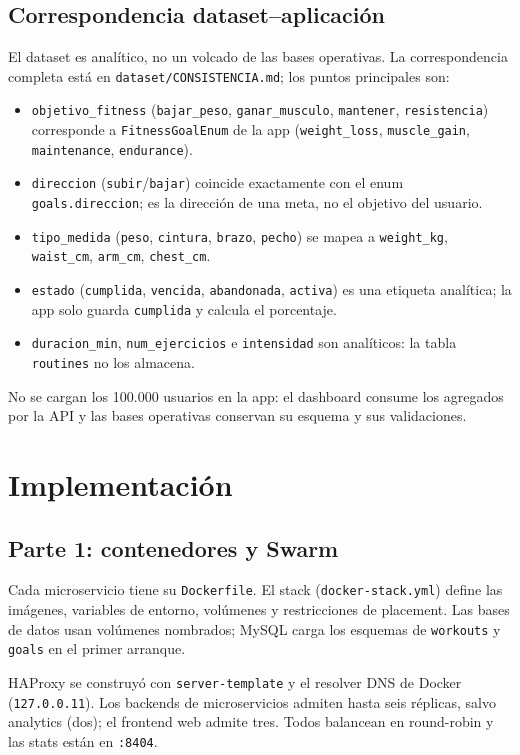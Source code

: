 \documentclass[conference]{IEEEtran}
\begin{document}
\subsection{Correspondencia dataset--aplicación}
El dataset es analítico, no un volcado de las bases operativas. La correspondencia completa está en
\texttt{dataset/CONSISTENCIA.md}; los puntos principales son:
\begin{itemize}
\item \texttt{objetivo\_fitness} (\texttt{bajar\_peso}, \texttt{ganar\_musculo}, \texttt{mantener},
\texttt{resistencia}) corresponde a \texttt{FitnessGoalEnum} de la app
(\texttt{weight\_loss}, \texttt{muscle\_gain}, \texttt{maintenance}, \texttt{endurance}).
\item \texttt{direccion} (\texttt{subir}/\texttt{bajar}) coincide exactamente con el enum
\texttt{goals.direccion}; es la dirección de una meta, no el objetivo del usuario.
\item \texttt{tipo\_medida} (\texttt{peso}, \texttt{cintura}, \texttt{brazo}, \texttt{pecho}) se
mapea a \texttt{weight\_kg}, \texttt{waist\_cm}, \texttt{arm\_cm}, \texttt{chest\_cm}.
\item \texttt{estado} (\texttt{cumplida}, \texttt{vencida}, \texttt{abandonada}, \texttt{activa}) es
una etiqueta analítica; la app solo guarda \texttt{cumplida} y calcula el porcentaje.
\item \texttt{duracion\_min}, \texttt{num\_ejercicios} e \texttt{intensidad} son analíticos: la tabla
\texttt{routines} no los almacena.
\end{itemize}
No se cargan los 100.000 usuarios en la app: el dashboard consume los agregados por la API y las
bases operativas conservan su esquema y sus validaciones.

\section{Implementación}
\subsection{Parte 1: contenedores y Swarm}
Cada microservicio tiene su \texttt{Dockerfile}. El stack (\texttt{docker-stack.yml}) define las
imágenes, variables de entorno, volúmenes y restricciones de placement. Las bases de datos usan
volúmenes nombrados; MySQL carga los esquemas de \texttt{workouts} y \texttt{goals} en el primer
arranque.

HAProxy se construyó con \texttt{server-template} y el resolver DNS de Docker
(\texttt{127.0.0.11}). Los backends de microservicios admiten hasta seis réplicas, salvo analytics
(dos); el frontend web admite tres. Todos balancean en round-robin y las stats están en
\texttt{:8404}.
\end{document}
